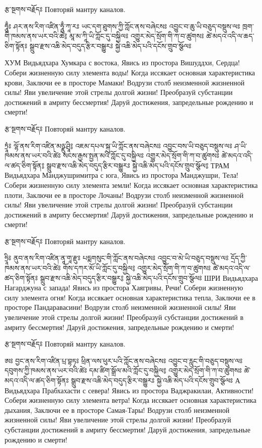 རྩ་སྔགས་བརྗོདཿ
Повторяй мантру каналов.
 
ཧཱུྃཿ ཤར་ནས་རིག་འཛིན་ཧཱུྃ་ཀཱ་རཿ 
ཡང་དག་ཐུགས་ཀྱི་ཀློང་ནས་བཞེངསཿ 
འབྱུང་བ་ཆུ་ཡི་བཅུད་བསྡུས་ལཿ 
ཁྲག་གི་ཁམས་ནས་ཡར་བའི་ཚེ༔ 
མཱ་མ་ཀཱི་ཡི་ཀློང་དུ་བསྐྱིལཿ 
འགྱུར་མེད་སྲོག་གི་ཀ་བ་ཚུགསཿ 
ཚེ་མདའ་འདི་ལ་ཆད་ཅིག་སྟོནཿ 
སྒྲུབ་རྫས་འཆི་མེད་བདུད་རྩིར་བསྒྱུརཿ 
སྐྱེ་འཆི་མེད་པའི་དངོས་གྲུབ་སྩོལཿ 

ХУМ  Видьядхара Хумкара с востока,
Явись из простора Вишуддхи, Сердца!
Собери жизненную силу элемента воды!
Когда иссякает основная характеристика крови,
Заключи ее в просторе Мамаки!
Водрузи столб неизменной жизненной силы!
Яви увеличение этой стрелы долгой жизни!
Преобразуй субстанции достижений в амриту бессмертия!
Даруй достижения, запредельные рождению и смерти!

རྩ་སྔགས་བརྗོདཿ 
Повторяй мантру каналов.

ཏྲཱཾཿ ལྷོ་ནས་རིག་འཛིན་མཉྫུ་ཤྲཱི༔ 
འཇམ་དཔལ་སྐུ་ཡི་ཀློང་ནས་བཞེངསཿ 
འབྱུང་བས་ཡི་བཅུད་བསྡུས་ལཿ 
ཤ་ཡི་ཁམས་ནས་ཡར་བའི་ཚེཿ 
སངས་རྒྱས་སྤྱན་མའི་ཀློང་དུ་བསྐྱིལཿ 
འགྱུར་མེད་སྲོག་གི་ཀ་བ་ཚུགསཿ 
ཚེ་མདའ་འདི་ལ་ཚད་ཅིག་སྟོན༔ 
སྒྲུབ་རྫས་འཆི་མེད་བདུད་རྩིར་བསྒྱུརཿ 
སྐྱེ་འཆི་མེད་པའི་དངོས་གྲུབ་སྩོལ༔ 
ТРАМ   Видьядхара Манджушримитра с юга,
Явись из простора Манджушри, Тела!
Собери жизненную силу элемента земли!
Когда иссякает основная характеристика плоти,
Заключи ее в просторе Лочаны!
Водрузи столб неизменной жизненной силы!
Яви увеличение этой стрелы долгой жизни!
Преобразуй субстанции достижений в амриту бессмертия!
Даруй достижения, запредельные рождению и смерти!

རྩ་སྔགས་བརྗོདཿ 
Повторяй мантру каналов.

ཧྲཱིཿ ནུབ་ནས་རིག་འཛིན་ནཱ་གཱ་རྫུཿ 
པདྨགསུང་གི་ཀློང་ནས་བཞེངསཿ 
འབྱུང་བ་མེ་ཡི་བཅུད་བསྡུས་ལཿ 
དྲོད་ཀྱི་ཁམས་ནས་ཡར་བའི་ཚེཿ 
གོས་དཀར་མོ་ཡི་ཀློང་དུ་བསྐྱིལ༔ 
འགྱུར་མེད་སྲོག་གི་ཀ་བ་ཚུགསཿ 
ཚེ་མདའ་འདི་ལ་ཚད་ཅིག་སྟོནཿ 
སྒྲུབ་རྫས་འཆི་མེད་བདུད་རྩིར་བསྒྱུར༔ 
སྐྱེ་འཆི་མེད་པའི་དངོས་གྲུབ་སྩོལཿ 
ШРИ   Видьядхара Нагарджуна с запада!
Явись из простора Хаягривы, Речи!
Собери жизненную силу элемента огня!
Когда иссякает основная характеристика тепла,
Заключи ее в просторе Пандаравасини!
Водрузи столб неизменной жизненной силы!
Яви увеличение этой стрелы долгой жизни!
Преобразуй субстанции достижений в амриту бессмертия!
Даруй достижения, запредельные рождению и смерти!

རྩ་སྔགས་བརྗོདཿ 
Повторяй мантру каналов.

ཨཿ བྱང་ནས་རིག་འཛིན་པྲ་བྷཏཿ 
ཕྲིན་ལས་ཕུར་པའི་ཀློང་ནས་བཞེངསཿ 
འབྱུང་བ་རླུང་གི་བཅུད་བསྡུས་ལཿ 
དབུགས་ཀྱི་ཁམས་ནས་ཡར་བའི་ཚེཿ 
དམ་ཚིག་སྒྲོལ་མའི་ཀློང་དུ་བསྐྱིལ༔ 
འགྱུར་མེད་སྲོག་གི་ཀ་བ་ཚུགསཿ 
ཚེ་མདའ་འདི་ལ་ཚད་ཅིག་སྟོནཿ 
སྒྲུབ་རྫས་འཆི་མེད་བདུད་རྩིར་བསྒྱུརཿ 
སྐྱེ་འཆི་མེད་པའི་དངོས་གྲུབ་སྩོལཿ 
А   Видьядхара Прабхахасти с севера!
Явись из простора Ваджракилаи, Активности!
Собери жизненную силу элемента ветра!
Когда иссякает основная характеристика дыхания,
Заключи ее в просторе Самая-Тары!
Водрузи столб неизменной жизненной силы!
Яви увеличение этой стрелы долгой жизни!
Преобразуй субстанции достижений в амриту бессмертия!
Даруй достижения, запредельные рождению и смерти!


